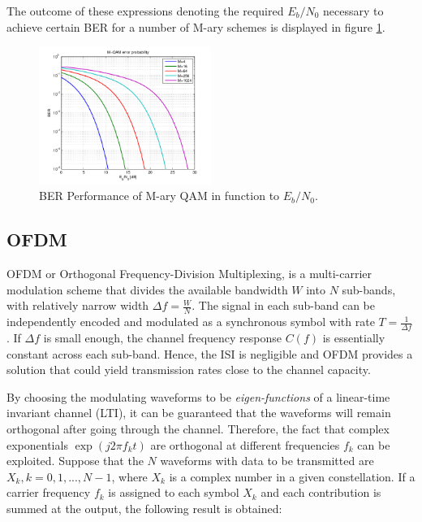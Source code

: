 \documentclass[12pt,a4paper,openright]{report}
\begin{document}
The outcome of these expressions denoting the required $E_b / N_0$ necessary to achieve certain BER for a number of M-ary schemes is displayed in figure \ref{fig:mqamber}.

 \begin{figure}[H]
  \centering
    \includegraphics[width=0.5\textwidth]{MQAMber.png}
    \caption[BER Performance of M-ary QAM in function to $E_b / N_0$]{BER Performance of M-ary QAM in function to $E_b / N_0$.}
    \label{fig:mqamber}
\end{figure}




\subsection{OFDM}
\label{sec:OFDM}
OFDM or Orthogonal Frequency-Division Multiplexing, is a multi-carrier modulation scheme that divides the available bandwidth $W$ into $N$ sub-bands, with relatively narrow width $\Delta f = \frac{W}{N}$. The signal in each sub-band can be independently encoded and modulated as a synchronous symbol with rate $T = \frac{1}{\Delta f}$. If $\Delta f$ is small enough, the channel frequency response $C(f)$ is essentially constant across each sub-band. Hence, the ISI is negligible and OFDM provides a solution that could yield transmission rates close to the channel capacity. 

By choosing the modulating waveforms to be \emph{eigen-functions} of a linear-time invariant channel (LTI), it can be guaranteed that the waveforms will remain orthogonal after going through the channel. Therefore, the fact that complex exponentials $\exp{(j2\pi f_k t)}$ are orthogonal at different frequencies $f_k$  can be exploited.  Suppose that the $N$ waveforms with data to be transmitted are $X_k, k=0,1,...,N-1$, where $X_k$ is a complex number in a given constellation. If a carrier frequency $f_k$ is assigned to each symbol $X_k$ and each contribution is summed at the output, the following result is obtained:
\end{document}

